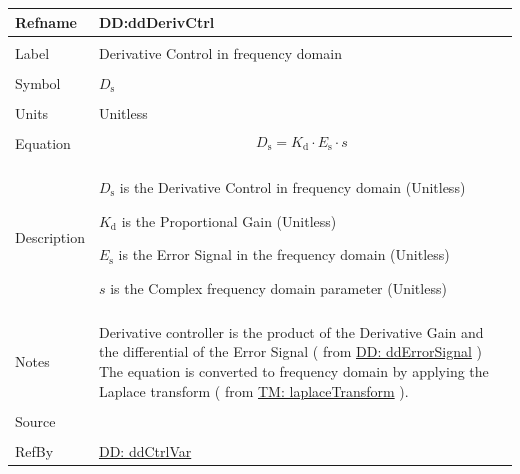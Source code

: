 \documentclass[12pt]{article}
\begin{document}
\vspace{\baselineskip}
\noindent
\begin{minipage}{\textwidth}
\begin{tabular}{>{\raggedright}p{}>{\raggedright\arraybackslash}p{}}
\toprule \textbf{Refname} & \textbf{DD:ddDerivCtrl}
\label{DD:ddDerivCtrl}
\\ \midrule \\
Label & Derivative Control in frequency domain
        
\\ \midrule \\
Symbol & ${D_{\text{s}}}$
         
\\ \midrule \\
Units & Unitless
        
\\ \midrule \\
Equation & \begin{displaymath}
           {D_{\text{s}}}={K_{\text{d}}}\cdot{}{E_{\text{s}}}\cdot{}s
           \end{displaymath}
\\ \midrule \\
Description & \begin{symbDescription}
              \item{${D_{\text{s}}}$ is the Derivative Control in frequency domain (Unitless)}
              \item{${K_{\text{d}}}$ is the Proportional Gain (Unitless)}
              \item{${E_{\text{s}}}$ is the Error Signal in the frequency domain (Unitless)}
              \item{$s$ is the Complex frequency domain parameter (Unitless)}
              \end{symbDescription}
\\ \midrule \\
Notes & Derivative controller is the product of the Derivative Gain and the differential of the Error Signal ( from  \hyperref[DD:ddErrorSignal]{DD: ddErrorSignal} ) The equation is converted to frequency domain by applying the Laplace transform ( from \hyperref[TM:laplaceTransform]{TM: laplaceTransform} ).
        
\\ \midrule \\
Source & \cite{johnson2008}
         
\\ \midrule \\
RefBy & \hyperref[DD:ddCtrlVar]{DD: ddCtrlVar}
        
\\ \bottomrule
\end{tabular}
\end{minipage}
\end{document}
